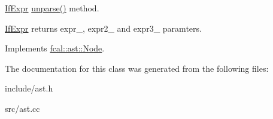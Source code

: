 \hyperlink{classfcal_1_1ast_1_1IfExpr}{If\+Expr} \hyperlink{classfcal_1_1ast_1_1IfExpr_a4092cf20150a2cde02364d4c7233e558}{unparse()} method. 

\hyperlink{classfcal_1_1ast_1_1IfExpr}{If\+Expr} returns expr\+\_\+, expr2\+\_\+ and expr3\+\_\+ paramters. 

Implements \hyperlink{classfcal_1_1ast_1_1Node_a81865f5a1df593708a39bf492952742a}{fcal\+::ast\+::\+Node}.



The documentation for this class was generated from the following files\+:\begin{DoxyCompactItemize}
\item 
include/ast.\+h\item 
src/ast.\+cc\end{DoxyCompactItemize}
